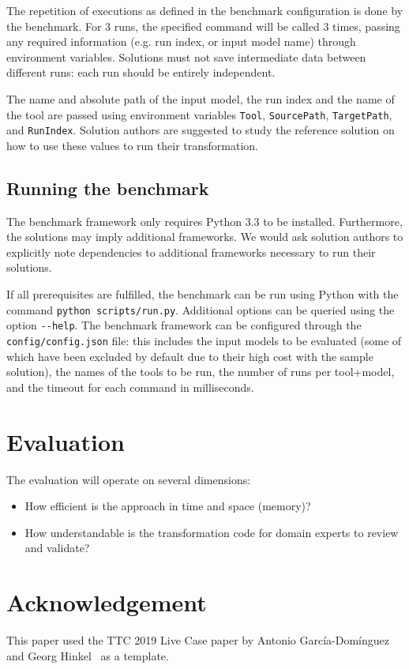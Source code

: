 \documentclass[a4paper]{scrartcl}
\newcommand*{\file}[1]{\texttt{#1}}
\begin{document}
The repetition of executions as defined in the benchmark configuration is done
by the benchmark. For 3 runs, the specified command will be called 3 times,
passing any required information (e.g. run index, or input model name) through
environment variables. Solutions must not save intermediate data between
different runs: each run should be entirely independent.

The name and absolute path of the input model, the run index and the name of the
tool are passed using environment variables \file{Tool}, \file{SourcePath},
\file{TargetPath}, and \file{RunIndex}.
Solution authors are suggested to study the reference solution on how to use
these values to run their transformation.

\subsection{Running the benchmark}
\label{sec:running-benchmark}

The benchmark framework only requires Python 3.3 to be installed. Furthermore,
the solutions may imply additional frameworks. We would ask solution authors to
explicitly note dependencies to additional frameworks necessary to run their
solutions.

If all prerequisites are fulfilled, the benchmark can be run using Python with
the command \file{python scripts/run.py}. Additional options can be queried
using the option \file{{-}{-}help}. The benchmark framework can be configured
through the \file{config/config.json} file: this includes the input models to be
evaluated (some of which have been excluded by default due to their high cost
with the sample solution), the names of the tools to be run, the number of runs
per tool+model, and the timeout for each command in milliseconds.

\section{Evaluation}
\label{sec:evaluation}

The evaluation will operate on several dimensions:

\begin{itemize}
\item How efficient is the approach in time and space (memory)?

\item How understandable is the transformation code for domain experts to review and validate?
\end{itemize}

\section*{Acknowledgement}

This paper used the TTC 2019 Live Case paper by Antonio García-Domínguez and
Georg Hinkel~\cite{garcia_dominguez_ttc_2019} as a template.



\end{document}
